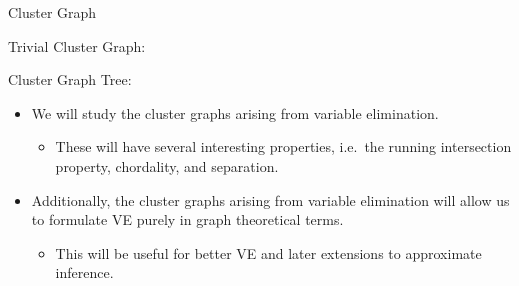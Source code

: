 \begin{frame}{Cluster Graph}
\begin{example}
\begin{minipage}[t]{0.24\textwidth}
\begin{center}
\end{center}
\end{minipage}
\pause
\hfill\vrule\hfill
\begin{minipage}[t]{0.24\textwidth}
\begin{center}
Trivial Cluster Graph:
\vspace{1cm}\\
\end{center}
\end{minipage}
\pause
\hfill\vrule\hfill
\begin{minipage}[t]{0.24\textwidth}
\begin{center}
Cluster Graph Tree:
\vspace{1cm}\\
\end{center}
\end{minipage}
\end{example}

\begin{itemize}
\pause \item We will study the cluster graphs arising from variable elimination.
\begin{itemize}
    \pause \item These will have several interesting properties, i.e.\ the running intersection property, chordality, and separation.
\end{itemize}
\pause \item Additionally, the cluster graphs arising from variable elimination will allow us to formulate VE purely in graph theoretical terms.
\begin{itemize}
    \pause \item This will be useful for better VE and later extensions to approximate inference.
\end{itemize}
\end{itemize}
\end{frame}


